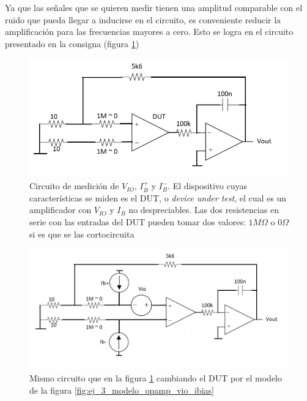 \documentclass[../../main.tex]{subfiles}
\begin{document}
Ya que las se\~nales que se quieren medir tienen una amplitud comparable con el ruido que pueda llegar a inducirse en el circuito, es conveniente reducir la amplificaci\'on para las frecuencias mayores a cero. Esto se logra en el circuito presentado en la consigna (figura \ref{fig:ej_3_medicion_vio_consigna})

\begin{figure}[htbp] %

	\centering
	\includegraphics[scale=1]{imagenes/medicion_bias_configuracion_consigna.png}
	\caption{Circuito de medici\'on de $V_{IO}$, $I_B^+$ y $I_B^-$. El dispositivo cuyas caracter\'isticas se miden es el DUT, o \textit{device under test}, el cual es un amplificador con $V_{IO}$ y $I_B$ no despreciables. Las dos resistencias en serie con las entradas del DUT pueden tomar dos valores: $1M\Omega$ o $0\Omega$ si es que se las cortocircuita}
	\label{fig:ej_3_medicion_vio_consigna}
\end{figure}
\begin{figure}[htbp] %
	\centering
	\includegraphics[scale=1]{imagenes/medicion_bias_configuracion_consigna_dos.png}
	\caption{Mismo circuito que en la figura \ref{fig:ej_3_medicion_vio_consigna} cambiando el DUT por el modelo de la figura \ref{fig:ej_3_modelo_opamp_vio_ibias}}
	\label{fig:ej_3_medicion_vio_consigna_modelando}
\end{figure}
\end{document}
